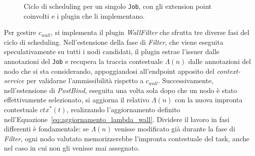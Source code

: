 \begin{figure}[htb]
    \caption{Ciclo di scheduling per un singolo \texttt{Job}, con gli extension point coinvolti e i plugin che li implementano.}
    \label{fig:ciclo_scheduling}
\end{figure}

Per gestire $c_{wall}$, si implementa il plugin \emph{WallFilter} che sfrutta tre diverse fasi del ciclo di scheduling. Nell'estensione della fase di \emph{Filter}, che viene eseguita speculativamente su tutti i nodi candidati, il plugin estrae l'issuer dalle annotazioni del \texttt{Job} e recupera la traccia contestuale $\Lambda(n)$ dalle annotazioni del nodo che si sta considerando, appoggiandosi all'endpoint apposito del \emph{context-service} per validarne l'ammissibilità rispetto a $c_{wall}$. Successivamente, nell'estensione di \emph{PostBind}, eseguita una volta sola dopo che un nodo è stato effettivamente selezionato, si aggiorna il relativo $\Lambda(n)$ con la nuova impronta contestuale $ctx^*(t)$, realizzando l'aggiornamento definito nell'Equazione~\eqref{eq:aggiornamento_lambda_wall}. Dividere il lavoro in fasi differenti è fondamentale: se $\Lambda(n)$ venisse modificato già durante la fase di \emph{Filter}, ogni nodo valutato memorizzerebbe l'impronta contestuale del task, anche nel caso in cui non gli venisse mai assegnato. 

